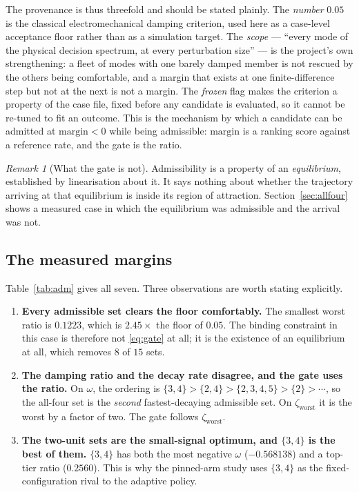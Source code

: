 \documentclass[12pt,a4paper]{article}
\theoremstyle{remark}
\newtheorem{remark}{Remark}
\newcommand{\zworst}{\zeta_{\mathrm{worst}}}
\begin{document}
The provenance is thus threefold and should be stated plainly. The
\emph{number} $0.05$ is the classical electromechanical damping criterion, used
here as a case-level acceptance floor rather than as a simulation target. The
\emph{scope} --- ``every mode of the physical decision spectrum, at every
perturbation size'' --- is the project's own strengthening: a fleet of modes
with one barely damped member is not rescued by the others being comfortable,
and a margin that exists at one finite-difference step but not at the next is
not a margin. The \emph{frozen} flag makes the criterion a property of the case
file, fixed before any candidate is evaluated, so it cannot be re-tuned to fit an
outcome. This is the mechanism by which a candidate can be admitted at
$\mathrm{margin} < 0$ while being admissible: $\mathrm{margin}$ is a ranking
score against a reference rate, and the gate is the ratio.

\begin{remark}[What the gate is not]
Admissibility is a property of an \emph{equilibrium}, established by
linearisation about it. It says nothing about whether the trajectory arriving at
that equilibrium is inside its region of attraction. Section~\ref{sec:allfour}
shows a measured case in which the equilibrium was admissible and the arrival
was not.
\end{remark}

\subsection{The measured margins}

Table~\ref{tab:adm} gives all seven. Three observations are worth stating
explicitly.

\begin{enumerate}[leftmargin=1.6em,itemsep=2.5pt]
\item \textbf{Every admissible set clears the floor comfortably.} The smallest
      worst ratio is $0.1223$, which is $2.45\times$ the floor of $0.05$. The
      binding constraint in this case is therefore not \eqref{eq:gate} at all;
      it is the existence of an equilibrium at all, which removes $8$ of $15$
      sets.
\item \textbf{The damping ratio and the decay rate disagree, and the gate uses
      the ratio.} On $\omega$, the ordering is
      $\{3,4\} > \{2,4\} > \{2,3,4,5\} > \{2\} > \cdots$, so the all-four set is
      the \emph{second} fastest-decaying admissible set. On $\zworst$ it is the
      worst by a factor of two. The gate follows $\zworst$.
\item \textbf{The two-unit sets are the small-signal optimum, and $\{3,4\}$ is
      the best of them.} $\{3,4\}$ has both the most negative $\omega$
      ($-0.568138$) and a top-tier ratio ($0.2560$). This is why the pinned-arm
      study uses $\{3,4\}$ as the fixed-configuration rival to the adaptive
      policy.
\end{enumerate}
\end{document}
